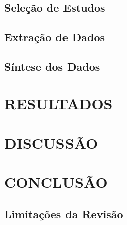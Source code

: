 \subsection{Seleção de Estudos}
\subsection{Extração de Dados}
\subsection{Síntese dos Dados}

\section{RESULTADOS}


\section{DISCUSSÃO}

\section{CONCLUSÃO}
\subsection{Limitações da Revisão}

